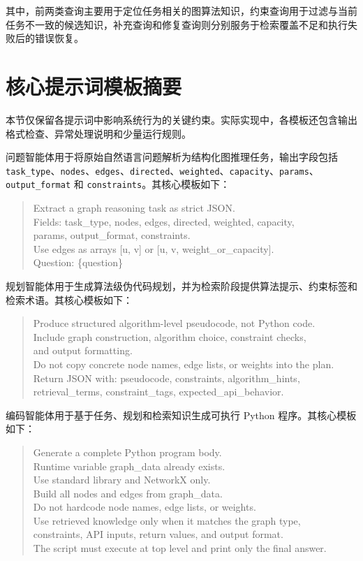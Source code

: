 其中，前两类查询主要用于定位任务相关的图算法知识，约束查询用于过滤与当前任务不一致的候选知识，补充查询和修复查询则分别服务于检索覆盖不足和执行失败后的错误恢复。

\section{核心提示词模板摘要}

本节仅保留各提示词中影响系统行为的关键约束。实际实现中，各模板还包含输出格式检查、异常处理说明和少量运行规则。


问题智能体用于将原始自然语言问题解析为结构化图推理任务，输出字段包括 \texttt{task\_type}、\texttt{nodes}、\texttt{edges}、\texttt{directed}、\texttt{weighted}、\texttt{capacity}、\texttt{params}、\texttt{output\_format} 和 \texttt{constraints}。其核心模板如下：

\begin{quote}
\small
\ttfamily
Extract a graph reasoning task as strict JSON.\\
Fields: task\_type, nodes, edges, directed, weighted, capacity,\\
params, output\_format, constraints.\\
Use edges as arrays [u, v] or [u, v, weight\_or\_capacity].\\
Question: \{question\}
\end{quote}

规划智能体用于生成算法级伪代码规划，并为检索阶段提供算法提示、约束标签和检索术语。其核心模板如下：

\begin{quote}
\small
\ttfamily
Produce structured algorithm-level pseudocode, not Python code.\\
Include graph construction, algorithm choice, constraint checks,\\
and output formatting.\\
Do not copy concrete node names, edge lists, or weights into the plan.\\
Return JSON with: pseudocode, constraints, algorithm\_hints,\\
retrieval\_terms, constraint\_tags, expected\_api\_behavior.
\end{quote}

编码智能体用于基于任务、规划和检索知识生成可执行 Python 程序。其核心模板如下：

\begin{quote}
\small
\ttfamily
Generate a complete Python program body.\\
Runtime variable graph\_data already exists.\\
Use standard library and NetworkX only.\\
Build all nodes and edges from graph\_data.\\
Do not hardcode node names, edge lists, or weights.\\
Use retrieved knowledge only when it matches the graph type,\\
constraints, API inputs, return values, and output format.\\
The script must execute at top level and print only the final answer.
\end{quote}

